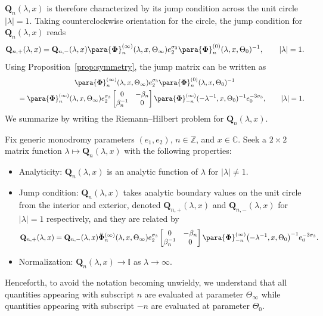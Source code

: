 $\mathbf{Q}_n(\lambda,x)$ is therefore characterized by its jump condition across the unit circle $|\lambda|=1$. Taking counterclockwise orientation for the circle, the jump condition for $\mathbf{Q}_n(\lambda,x)$ reads
\begin{equation*}
 \mathbf{Q}_{n,+}(\lambda,x)=\mathbf{Q}_{n,-}(\lambda,x)\para{\mathbf{\Phi}}_n^{(\infty)}(\lambda,x, \Theta_\infty)e_2^{\sigma_3}\para{\mathbf{\Phi}}_n^{(0)}(\lambda,x, \Theta_0)^{-1},\qquad |\lambda|=1.
\end{equation*}
Using Proposition~\ref{prop:symmetry}, the jump matrix can be written as
\begin{gather}
 \para{\mathbf{\Phi}}_n^{(\infty)}(\lambda,x, \Theta_\infty)e_2^{\sigma_3}\para{\mathbf{\Phi}}_n^{(0)}(\lambda,x, \Theta_0)^{-1}\nonumber\\
 \qquad =\para{\mathbf{\Phi}}^{(\infty)}_n(\lambda,x, \Theta_\infty) e_2^{\sigma_3}
 \begin{bmatrix}0 & -\beta_n\\ \beta_n^{-1} & 0\end{bmatrix}
 \para{\mathbf{\Phi}}^{(\infty)}_{-n}(-\lambda^{-1},x, \Theta_0)^{-1}e_0^{-3\sigma_3},\qquad |\lambda|=1.\label{eq:VQ-rewrite}
\end{gather}
We summarize by writing the Riemann--Hilbert problem for $\mathbf{Q}_n(\lambda,x)$.
\begin{rhp}\label{rhp:Q}
Fix generic monodromy parameters $( e_1, e_2)$, $n\in\mathbb{Z}$, and $x\in\mathbb{C}$. Seek a $2\times 2$ matrix function $\lambda\mapsto\mathbf{Q}_n(\lambda,x)$ with the following properties:
\begin{itemize}\itemsep=0pt\samepage
 \item Analyticity: $\mathbf{Q}_n(\lambda,x)$ is an analytic function of $\lambda$ for $|\lambda|\neq 1$.
 \item Jump condition:
 $\mathbf{Q}_n(\lambda,x)$ takes analytic boundary values on the unit circle from the interior and exterior, denoted $\mathbf{Q}_{n,+}(\lambda,x)$ and $\mathbf{Q}_{n,-}(\lambda,x)$ for $|\lambda|=1$ respectively, and they are related by
 \begin{equation*}
 \mathbf{Q}_{n,+}(\lambda,x)=\mathbf{Q}_{n,-}(\lambda,x)\breve{\mathbf{\Phi}}_n^{(\infty)}(\lambda,x,\Theta_\infty)e_2^{\sigma_3}
 \begin{bmatrix}0 & -\beta_n\\\beta_n^{-1} & 0\end{bmatrix}
 \para{\mathbf{\Phi}}^{(\infty)}_{-n}\bigl(-\lambda^{-1},x, \Theta_0\bigr)^{-1}e_0^{-3\sigma_3}.
 \end{equation*}
 \item Normalization:
 $\mathbf{Q}_n(\lambda,x)\to\mathbb{I}$ as $\lambda\to\infty$.
\end{itemize}
\end{rhp}
Henceforth, to avoid the notation becoming unwieldy, we understand that all quantities appearing with subscript $n$ are evaluated at parameter $\Theta_\infty$ while quantities appearing with subscript $-n$ are evaluated at parameter $\Theta_0$.

